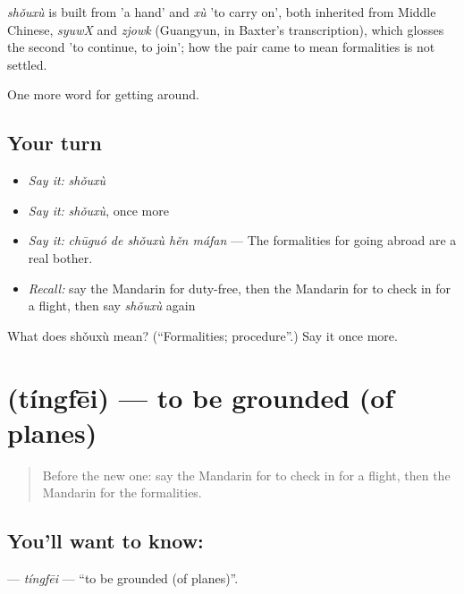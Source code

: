 \begin{cousinweb}
\emph{shǒuxù} is built from  'a hand' and \emph{xù} 'to carry on', both inherited from Middle Chinese, \emph{syuwX} and \emph{zjowk} (Guangyun, in Baxter's transcription), which glosses the second 'to continue, to join'; how the pair came to mean formalities is not settled.
\end{cousinweb}

\begin{grammarlens}[title={What you've built}]
One more word for getting around.
\end{grammarlens}

\subsection*{Your turn}
\begin{itemize}
\raggedright
  \item \emph{Say it:} \emph{shǒuxù}
  \item \emph{Say it:} \emph{shǒuxù}, once more
  \item \emph{Say it:} \emph{chūguó de shǒuxù hěn máfan} — The formalities for going abroad are a real bother.
  \item \emph{Recall:} say the Mandarin for duty-free, then the Mandarin for to check in for a flight, then say \emph{shǒuxù} again
\end{itemize}

\begin{tcolorbox}[breakable,colback=teal!4,colframe=teal!35!black,title={Before you move on}]
What does shǒuxù mean? (\textquotedblleft{}Formalities; procedure\textquotedblright{}.) Say it once more.
\end{tcolorbox}
\section[\texorpdfstring{\zh{停飞} (tíngfēi)}{停飞 (tíngfēi)}]{ (tíngfēi) — to be grounded (of planes)}

\label{lesson:ZH-C418-tingfei}



\begin{quote}
Before the new one: say the Mandarin for to check in for a flight, then the Mandarin for the formalities.
\end{quote}

\subsection*{You'll want to know: }
\textbf{} — \emph{tíngfēi} — \textquotedblleft{}to be grounded (of planes)\textquotedblright{}.

